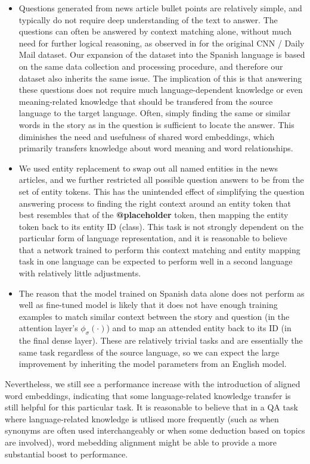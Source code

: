 \documentclass[]{article}
\begin{document}
\begin{itemize}
	\item Questions generated from news article bullet points are relatively simple, and typically do not require deep understanding of the text to answer. The questions can often be answered by context matching alone, without much need for further logical reasoning, as observed in \cite{chen2016thorough} for the original CNN / Daily Mail dataset. Our expansion of the dataset into the Spanish language is based on the same data collection and processing procedure, and therefore our dataset also inherits the same issue. The implication of this is that answering these questions does not require much language-dependent knowledge or even meaning-related knowledge that should be transfered from the source language to the target language. Often, simply finding the same or similar words in the story as in the question is sufficient to locate the answer. This diminishes the need and usefulness of shared word embeddings, which primarily transfers knowledge about word meaning and word relationships.
	\item We used entity replacement to swap out all named entities in the news articles, and we further restricted all possible question answers to be from the set of entity tokens. This has the unintended effect of simplifying the question answering process to finding the right context around an entity token that best resembles that of the \textbf{@placeholder} token, then mapping the entity token back to its entity ID (class). This task is not strongly dependent on the particular form of language representation, and it is reasonable to believe that a network trained to perform this context matching and entity mapping task in one language can be expected to perform well in a second language with relatively little adjustments.
	\item The reason that the model trained on Spanish data alone does not perform as well as fine-tuned model is likely that it does not have enough training examples to match similar context between the story and question (in the attention layer's $\phi_\sigma(\cdot)$) and to map an attended entity back to its ID (in the final dense layer). These are relatively trivial tasks and are essentially the same task regardless of the source language, so we can expect the large improvement by inheriting the model parameters from an English model.
\end{itemize}

Nevertheless, we still see a performance increase with the introduction of aligned word embeddings, indicating that some language-related knowledge transfer is still helpful for this particular task. It is reasonable to believe that in a QA task where language-related knowledge is utlised more frequently (such as when synonyms are often used interchangeably or when some deduction based on topics are involved), word mebedding alignment might be able to provide a more substantial boost to performance.
\end{document}
